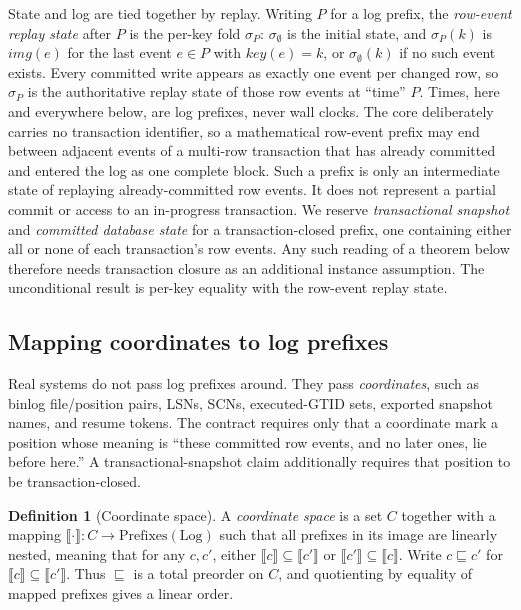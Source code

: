 \documentclass[sigconf,nonacm,10pt]{acmart}
\theoremstyle{plain}
\theoremstyle{definition}
\newtheorem{definition}{Definition}[section]
\newcommand{\den}[1]{\llbracket #1 \rrbracket}   %
\newcommand{\pre}{\sqsubseteq}                   %
\newcommand{\keyof}{\mathit{key}}                %
\newcommand{\imgof}{\mathit{img}}                %
\begin{document}
State and log are tied together by replay. Writing $P$ for a log
prefix, the \emph{row-event replay state} after $P$ is the per-key
fold $\sigma_P$:
$\sigma_\emptyset$ is the initial state, and $\sigma_P(k)$ is
$\imgof(e)$ for the last event $e \in P$ with $\keyof(e) = k$, or
$\sigma_\emptyset(k)$ if no such event exists. Every committed write
appears as exactly one event per changed row, so $\sigma_P$ is the
authoritative replay state of those row events at ``time'' $P$.
Times, here and everywhere below, are log prefixes, never wall
clocks. The core deliberately carries no transaction identifier, so
a mathematical row-event prefix may end between adjacent events of a
multi-row transaction that has already committed and entered the log as
one complete block. Such a prefix is only an intermediate state of
replaying already-committed row events. It does not represent a partial
commit or access to an in-progress transaction. We reserve
\emph{transactional snapshot} and
\emph{committed database state} for a transaction-closed prefix, one
containing either all or none of each transaction's row events. Any
such reading of a theorem below therefore needs transaction closure
as an additional instance assumption. The unconditional result is
per-key equality with the row-event replay state.

\subsection{Mapping coordinates to log prefixes}\label{sec:setting-coords}

Real systems do not pass log prefixes around. They pass
\emph{coordinates}, such as binlog file/position pairs, LSNs, SCNs,
executed-GTID sets, exported snapshot names, and resume tokens. The
contract requires only that a coordinate mark a
position whose meaning is ``these committed row events, and no later
ones, lie before here.'' A transactional-snapshot claim additionally
requires that position to be transaction-closed.

\begin{definition}[Coordinate space]\label{def:coords}
A \emph{coordinate space} is a set $C$ together with a mapping
$\den{\cdot} : C \to \mathrm{Prefixes}(\mathrm{Log})$ such that all
prefixes in its image are linearly nested, meaning that for any $c, c'$, either
$\den{c} \subseteq \den{c'}$ or $\den{c'} \subseteq \den{c}$. Write
$c \pre c'$ for $\den{c} \subseteq \den{c'}$. Thus $\pre$ is a total
preorder on $C$, and quotienting by equality of mapped prefixes gives a linear
order.
\end{definition}
\end{document}

